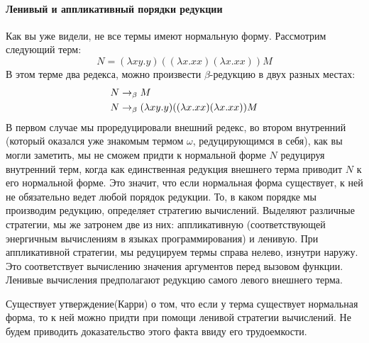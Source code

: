 \documentclass[lambda.tex]{subfiles}
\begin{document}
\paragraph{Ленивый и аппликативный порядки редукции} %
\label{par:lazy and energic reduction}

Как вы уже видели, не все термы имеют нормальную форму. Рассмотрим следующий терм:
\begin{equation*}
	N = (\lambda x y.y) ((\lambda x.xx)(\lambda x.xx)) M
\end{equation*}
В этом терме два редекса, можно произвести $\beta$-редукцию в двух разных местах:
\begin{align*}
	N &\rightarrow_\beta M\\
	N &\rightarrow_\beta (\lambda x y.y) ((\lambda x.xx)(\lambda x.xx)) M
\end{align*}
В первом случае мы проредуцировали внешний редекс, во втором внутренний (который оказался уже знакомым термом $\omega$, редуцирующимся в себя), как вы могли заметить, мы не сможем придти к нормальной форме $N$ редуцируя внутренний терм, когда как единственная редукция внешнего терма приводит $N$ к его нормальной форме. Это значит, что если нормальная форма существует, к ней не обязательно ведет любой порядок редукции. То, в каком порядке мы производим редукцию, определяет стратегию вычислений. Выделяют различные стратегии, мы же затронем две из них: аппликативную (соответствующей энергичным вычислениям в языках программирования) и ленивую.
При аппликативной стратегии, мы редуцируем термы справа нелево, изнутри наружу. Это соответствует вычислению значения аргументов перед вызовом функции.
Ленивые вычисления предполагают редукцию самого левого внешнего терма.

Существует утверждение(Карри) о том, что если у терма существует нормальная форма, то к ней можно придти при помощи ленивой стратегии вычислений. Не будем приводить доказательство этого факта ввиду его трудоемкости. 
\end{document}

